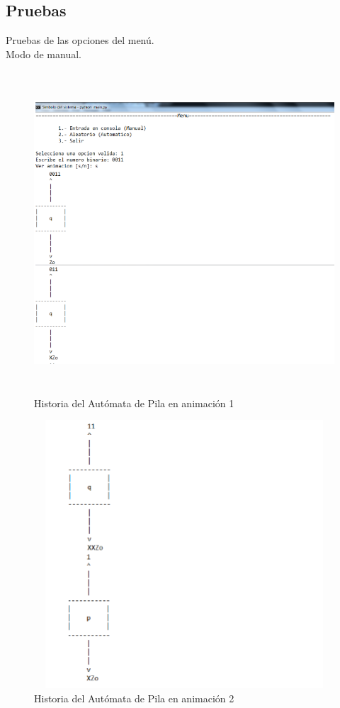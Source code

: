 	\subsection{Pruebas}
	Pruebas de las opciones del menú.
	\\
	{\large Modo de manual.}
	\begin{figure}[H]
		\begin{center}
			\includegraphics[width=14cm, height=12cm]{img/pila-manual-consola1.png}
			\caption{Historia del Autómata de Pila en animación 1}
			\label{fig:pila1a}
		\end{center}
	\end{figure}
	\begin{figure}[H]
		\begin{center}
			\includegraphics[width=14cm, height=10cm]{img/pila-manual-consola2.png}
			\caption{Historia del Autómata de Pila en animación 2}
			\label{fig:pila1b}
		\end{center}
	\end{figure}
